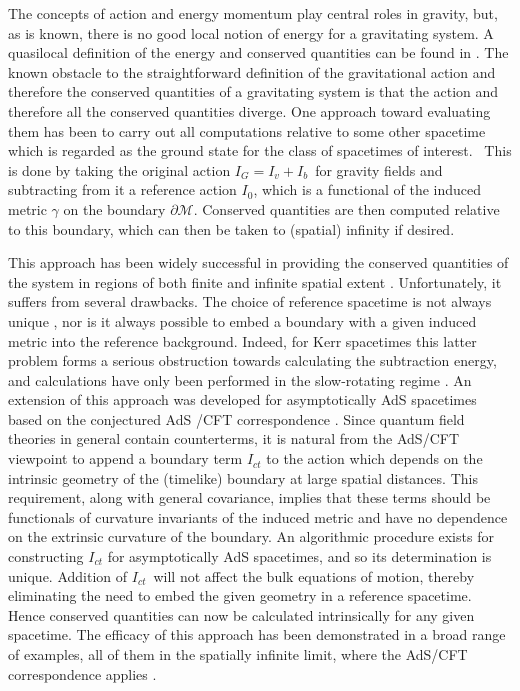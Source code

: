 \documentclass[a4paper,12pt,onecolumn]{revtex4}
\begin{document}
The concepts of action and energy momentum play central roles in
gravity, but, as is known, there is no good local notion of energy
for a gravitating system. A quasilocal definition of the energy
and conserved quantities can be found in \cite{BY}. The known
obstacle to the straightforward definition of the gravitational
action and therefore the conserved quantities of a gravitating
system is that the action and therefore all the conserved
quantities diverge. One approach toward evaluating them has been
to carry out all computations relative to some other spacetime
which is regarded as the ground state for the class of spacetimes
of interest. \ This is done by taking the original action
$I_G=I_v+I_b$\ for gravity fields and subtracting from it a
reference action $I_0$, which is a functional of the induced
metric $\gamma $ on the boundary $\partial \mathcal{M}$. Conserved
quantities are then computed relative to this boundary, which can
then be taken to (spatial) infinity if desired.

 This approach has been widely successful in providing the
conserved quantities of the system in regions of both finite and
infinite spatial extent \cite{BY,BCM}. Unfortunately, it suffers
from several drawbacks. The choice of reference spacetime is not
always unique \cite{CCM}, nor is it always possible to embed a
boundary with a given induced metric into the reference
background. Indeed, for Kerr spacetimes this latter problem forms
a serious obstruction towards calculating the subtraction energy,
and calculations have only been performed in the slow-rotating
regime \cite {Martinez}. An extension of this approach was
developed for asymptotically AdS spacetimes based on the
conjectured AdS /CFT correspondence
\cite{hensken,hyun,balakraus,Deh1}. Since quantum field theories
in general contain counterterms, it is natural from the AdS/CFT
viewpoint to append a boundary term $I_{ct}$ to the action which
depends on the intrinsic geometry of the (timelike) boundary at
large spatial distances. This requirement, along with general
covariance, implies that these terms should be functionals of
curvature invariants of the induced metric and have no dependence
on the extrinsic curvature of the boundary. An algorithmic
procedure \cite{kls} exists for constructing $I_{ct}$ for
asymptotically AdS spacetimes, and so its determination is unique.
Addition of $I_{ct}$\ will not affect the bulk equations of
motion, thereby eliminating the need to embed the given geometry
in a reference spacetime. Hence conserved quantities can now be
calculated intrinsically for any given spacetime. The efficacy of
this approach has been demonstrated in a broad range of examples,
all of them in the spatially infinite limit, where the AdS/CFT
correspondence applies \cite{nutent,EJM,nutkerr,dasman,Awad,vish}.
\end{document}
